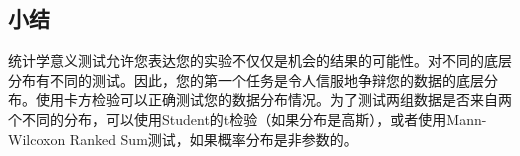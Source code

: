 \subsection{小结}
统计学意义测试允许您表达您的实验不仅仅是机会的结果的可能性。对不同的底层分布有不同的测试。因此，您的第一个任务是令人信服地争辩您的数据的底层分布。使用卡方检验可以正确测试您的数据分布情况。为了测试两组数据是否来自两个不同的分布，可以使用Student的t检验（如果分布是高斯），或者使用Mann-Wilcoxon Ranked Sum测试，如果概率分布是非参数的。
